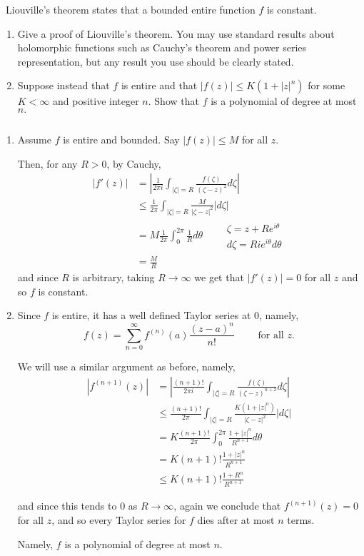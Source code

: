 \documentclass[12pt]{Homework}
\begin{document}
\begin{problem} $\,$ Liouville's theorem states that a bounded entire function $f$ is constant.
\begin{enumerate}[label=(\alph*)]
    \item Give a proof of Liouville's theorem. You may use standard results about holomorphic functions such as Cauchy's theorem and power series representation, but any result you use should be clearly stated.
    \item Suppose instead that $f$ is entire and that $|f(z)|\le K(1+|z|^n)$ for some $K<\infty$ and positive integer $n.$ Show that $f$ is a polynomial of degree at most $n.$
\end{enumerate}
\end{problem}


\begin{solution}$\,$
\begin{enumerate}[label=(\alph*)]
    \item Assume $f$ is entire and bounded. Say $|f(z)|\le M$ for all $z.$
    
    Then, for any $R>0$, by Cauchy, \begin{align*}
        |f'(z)|&=\left|\frac{1}{2\pi i}\int_{|\zeta|=R}\frac{f(\zeta)}{(\zeta-z)^2}d\zeta\right|\\
        &\le \frac{1}{2\pi}\int_{|\zeta|=R}\frac{M}{|\zeta-z|^2}|d\zeta|\\
        &=M\frac{1}{2\pi}\int_0^{2\pi}\frac{1}{R}d\theta \qquad \begin{matrix}
        \zeta= z+Re^{i\theta}\\
        d\zeta = Rie^{i\theta}d\theta
        \end{matrix}\\
        &=\frac{M}{R}
    \end{align*} and since $R$ is arbitrary, taking $R\to\infty$ we get that $|f'(z)|=0$ for all $z$ and so $f$ is constant.
    \item Since $f$ is entire, it has a well defined Taylor series at $0$, namely, $$f(z)=\sum_{n=0}^\infty f^{(n)}(a)\frac{(z-a)^n}{n!}\qquad\text{ for all }z.$$
    
    We will use a similar argument as before, namely, \begin{align*}
        |f^{(n+1)}(z)|&=\left|\frac{(n+1)!}{2\pi i}\int_{|\zeta|=R}\frac{f(\zeta)}{(\zeta-z)^{n+2}}d\zeta\right|\\
        &\le \frac{(n+1)!}{2\pi}\int_{|\zeta|=R}\frac{K(1+|z|^n)}{|\zeta-z|^2}|d\zeta|\\
        &=K\frac{(n+1)!}{2\pi}\int_0^{2\pi}\frac{1+|z|^n}{R^{n+1}}d\theta\\
        &=K(n+1)!\frac{1+|z|^n}{R^{n+1}}\\
        &\le K(n+1)!\frac{1+R^n}{R^{n+1}}    
    \end{align*}
    
    and since this tends to $0$ as $R\to\infty$, again we conclude that $f^{(n+1)}(z)=0$ for all $z$, and so every Taylor series for $f$ dies after at most $n$ terms.
    
    Namely, $f$ is a polynomial of degree at most $n.$
\end{enumerate}
\end{solution}
\end{document}
